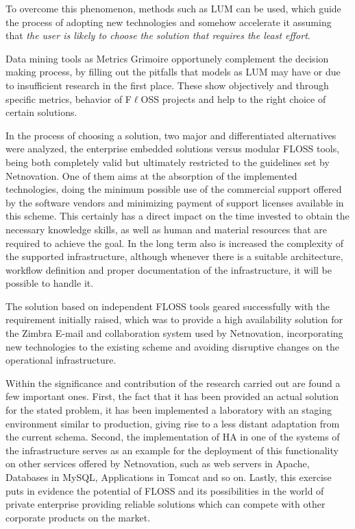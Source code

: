 \documentclass[a4paper, 12pt]{book}
\begin{document}
\noindent To overcome this phenomenon, methods such as LUM can be used, which guide the process of adopting new technologies and somehow accelerate it assuming that \textit{the user is likely to choose the solution that requires the least effort}.\bigskip

\noindent Data mining tools as Metrics Grimoire opportunely complement the decision making process, by filling out the pitfalls that models as LUM may have or due to insufficient research in the first place. These show objectively and through specific metrics, behavior of F$\ell$OSS projects and help to the right choice of certain solutions.\bigskip

\noindent In the process of choosing a solution, two major and differentiated alternatives were analyzed, the enterprise embedded solutions versus modular FLOSS tools, being both completely valid but ultimately restricted to the guidelines set by Netnovation. One of them aims at the absorption of the implemented technologies, doing the minimum possible use of the commercial support offered by the software vendors and minimizing payment of support licenses available in this scheme. This certainly has a direct impact on the time invested to obtain the necessary knowledge skills, as well as human and material resources that are required to achieve the goal. In the long term also is increased the complexity of the supported infrastructure, although whenever there is a suitable architecture, workflow definition and proper documentation of the infrastructure, it will be possible to handle it.\bigskip

\noindent The solution based on independent FLOSS tools geared successfully with the requirement initially raised, which was to provide a high availability solution for the Zimbra E-mail and collaboration system used by Netnovation, incorporating new technologies to the existing scheme and avoiding disruptive changes on the operational infrastructure.\bigskip

\noindent Within the significance and contribution of the research carried out are found a few important ones. First, the fact that it has been provided an actual solution for the stated problem, it has been implemented a laboratory with an staging environment similar to production, giving rise to a less distant adaptation from the current schema. Second, the implementation of HA in one of the systems of the infrastructure serves as an example for the deployment of this functionality on other services offered by Netnovation, such as web servers in Apache, Databases in MySQL, Applications in Tomcat and so on. Lastly, this exercise puts in evidence the potential of FLOSS and its possibilities in the world of private enterprise providing reliable solutions which can compete with other corporate products on the market.\bigskip
\end{document}

